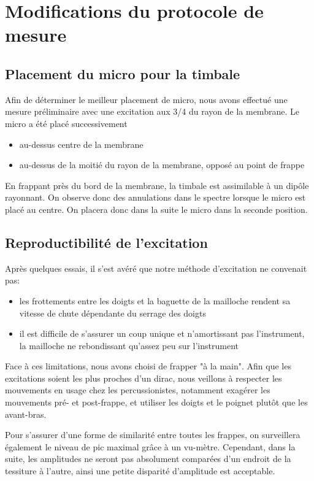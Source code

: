 \documentclass[atiam, article]{rapport} %
\begin{document}
\section{Modifications du protocole de mesure}

\subsection{Placement du micro pour la timbale}

Afin de déterminer le meilleur placement de micro, nous avons effectué une mesure préliminaire avec une excitation aux 3/4 du rayon de la membrane. Le micro a été placé successivement
\begin{itemize}
  \item au-dessus centre de la membrane
  \item au-dessus de la moitié du rayon de la membrane, opposé au point de frappe
\end{itemize}
En frappant près du bord de la membrane, la timbale est assimilable à un dipôle rayonnant. On observe donc des annulations dans le spectre lorsque le micro est placé au centre. On placera donc dans la suite le micro dans la seconde position.

\subsection{Reproductibilité de l'excitation}

Après quelques essais, il s'est avéré que notre méthode d'excitation ne convenait pas:
\begin{itemize}
  \item les frottements entre les doigts et la baguette de la mailloche rendent sa vitesse de chute dépendante du serrage des doigts
  \item il est difficile de s'assurer un coup unique et n'amortissant pas l'instrument, la mailloche ne rebondissant qu'assez peu sur l'instrument
\end{itemize}

Face à ces limitations, nous avons choisi de frapper "à la main". Afin que les excitations soient les plus proches d'un dirac, nous veillons à respecter les mouvements en usage chez les percussionistes, notamment exagérer les mouvements pré- et post-frappe, et utiliser les doigts et le poignet plutôt que les avant-bras.

Pour s'assurer d'une forme de similarité entre toutes les frappes, on surveillera également le niveau de pic maximal grâce à un vu-mètre. Cependant, dans la suite, les amplitudes ne seront pas absolument comparées d'un endroit de la tessiture à l'autre, ainsi une petite disparité d'amplitude est acceptable.
\end{document}
